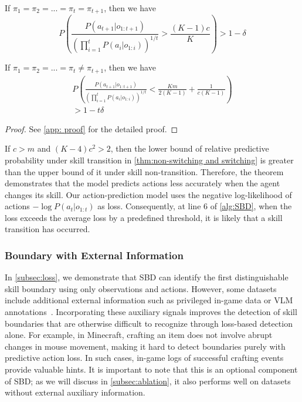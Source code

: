 \begin{theorem} \label{thm:non-switching and switching}
If $\pi_1=\pi_2=...=\pi_{t}=\pi_{t+1}$, then we have 
\begin{equation}
P(\frac{P(a_{t+1}|o_{1:t+1})}{(\prod_{i=1}^t P(a_{i}|o_{1:i}))^{1/t}}>\frac{(K-1)c}{K}) > 1-\delta
\end{equation}

If $\pi_1=\pi_2=...=\pi_{t}\ne\pi_{t+1}$, then we have 
\begin{equation}
\begin{split}
P(\frac{P(a_{t+1}|o_{1:t+1})}{(\prod_{i=1}^t P(a_{i}|o_{1:i}))^{1/t}} < \frac{Km}{2(K-1)} + \frac{1}{c(K-1)}) \\
> 1-t\delta
\end{split}
\end{equation}
\end{theorem}
\begin{proof}
    See \cref{app: proof} for the detailed proof.
\end{proof}

If $c>m$ and $(K-4)c^2>2$, then the lower bound of relative predictive probability under skill transition in \cref{thm:non-switching and switching} is greater than the upper bound of it under skill non-transition. Therefore, the theorem demonstrates that the model predicts actions less accurately when the agent changes its skill. Our action-prediction model uses the negative log-likelihood of actions $-\log P(a_t|o_{1:t})$ as loss. Consequently, at line 6 of \cref{alg:SBD}, when the loss exceeds the average loss by a predefined threshold, it is likely that a skill transition has occurred.

\subsubsection{Boundary with External Information}\label{subsec:info}

In \cref{subsec:loss}, we demonstrate that SBD can identify the first distinguishable skill boundary using only observations and actions. However, some datasets include additional external information such as privileged in-game data or VLM annotations~\citep{guo2025seed1,comanici2025gemini}. Incorporating these auxiliary signals improves the detection of skill boundaries that are otherwise difficult to recognize through loss-based detection alone. For example, in Minecraft, crafting an item does not involve abrupt changes in mouse movement, making it hard to detect boundaries purely with predictive action loss. In such cases, in-game logs of successful crafting events provide valuable hints. It is important to note that this is an optional component of SBD; as we will discuss in \cref{subsec:ablation}, it also performs well on datasets without external auxiliary information.

